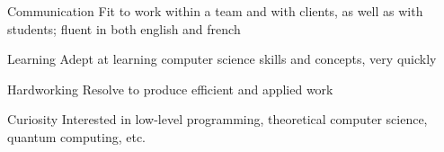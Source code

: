 

\begin{cvskills}

  \cvskill
    {Communication} %
    {Fit to work within a team and with clients, as well as with students; fluent in both english and french}
    
  \cvskill
    {Learning} %
    {Adept at learning computer science skills and concepts, very quickly}
    
  \cvskill
    {Hardworking} %
    {Resolve to produce efficient and applied work}
    
  \cvskill
    {Curiosity} %
    {Interested in low-level programming, theoretical computer science, quantum computing, etc.}

\end{cvskills}
